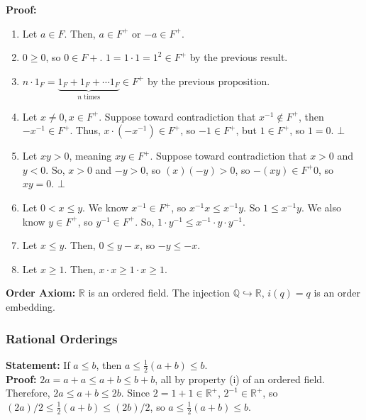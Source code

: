 \documentclass[10pt]{extarticle}
\newcommand{\Q}{\mathbb{Q}}
\newcommand{\R}{\mathbb{R}}
\begin{document}
    \textbf{Proof:}
      \begin{enumerate}[(1)]
        \item Let $a\in F$. Then, $a\in F^+$ or $-a\in F^+$.
        \item $0\geq 0$, so $0\in F+$. $1 = 1\cdot 1 = 1^2 \in F^+$ by the previous result.
        \item $n\cdot 1_F = \underbrace{1_F + 1_F + \cdots 1_F}_{\text{$n$ times}}\in F^+$ by the previous proposition.
        \item Let $x\neq 0, x\in F^+$. Suppose toward contradiction that $x^{-1}\notin F^+$, then $-x^{-1}\in F^+$. Thus, $x\cdot(-x^{-1})\in F^+$, so $-1\in F^+$, but $1\in F^+$, so $1 = 0$. $\bot$
        \item Let $xy > 0$, meaning $xy\in F^+$. Suppose toward contradiction that $x>0$ and $y<0$. So, $x>0$ and $-y > 0$, so $(x)(-y) > 0$, so $-(xy) \in F^+ 0$, so $xy = 0$. $\bot$
        \item Let $0 < x \leq y$. We know $x^{-1}\in F^+$, so $x^{-1}x \leq x^{-1}y$. So $1\leq x^{-1}y$. We also know $y\in F^+$, so $y^{-1}\in F^+$. So, $1\cdot y^{-1}\leq x^{-1}\cdot y\cdot y^{-1}$. 
        \item Let $x\leq y$. Then, $0\leq y-x$, so $-y\leq -x$.
        \item Let $x\geq 1$. Then, $x\cdot x \geq 1\cdot x \geq 1$.
      \end{enumerate}
    \textbf{Order Axiom:} $\R$ is an ordered field. The injection $\Q\hookrightarrow \R$, $i(q) = q$ is an order embedding.
    \subsubsection{Rational Orderings}%
    \textbf{Statement:} If $a\leq b$, then $a\leq \frac{1}{2}(a+b) \leq b$.\\

    \textbf{Proof:} $2a = a+a \leq a+b \leq b+b$, all by property (i) of an ordered field.\\

      Therefore, $2a \leq a+b \leq 2b$. Since $2 = 1+1 \in \R^+$, $2^{-1}\in \R^+$, so $(2a)/2 \leq \frac{1}{2}(a+b) \leq (2b)/2$, so $a\leq \frac{1}{2}(a+b) \leq b$.\\
\end{document}
